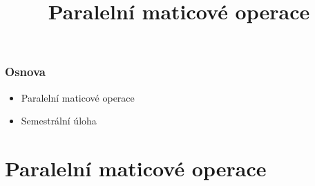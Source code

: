 \documentclass[usenames,dvipsnames,9pt]{beamer}
\title{Paralelní maticové operace}
\date{}
\institute{B4B36PDV -- Paralelní a distribuované výpočty}
\begin{document}
\maketitle

\begin{frame}
  \frametitle{Osnova}
  \begin{itemize}
    \item Paralelní maticové operace
    \item Semestrální úloha\\[1.5em]
  \end{itemize}
\end{frame}


%
%
%
%
%
%
% 
% 
%

\section{Paralelní maticové operace}
\end{document}
